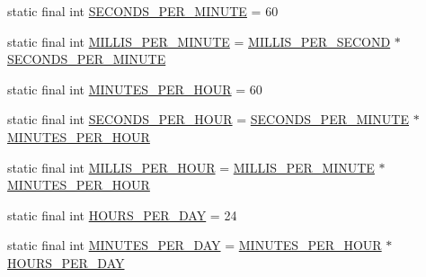 \begin{DoxyCompactItemize}
\item 
static final int \hyperlink{classorg_1_1joda_1_1time_1_1_date_time_constants_a0ad3e335b40d58daae80b70969dbc2ba}{S\-E\-C\-O\-N\-D\-S\-\_\-\-P\-E\-R\-\_\-\-M\-I\-N\-U\-T\-E} = 60
\item 
static final int \hyperlink{classorg_1_1joda_1_1time_1_1_date_time_constants_a4ba885e7d5accee33e78fa3bc8eaf19b}{M\-I\-L\-L\-I\-S\-\_\-\-P\-E\-R\-\_\-\-M\-I\-N\-U\-T\-E} = \hyperlink{classorg_1_1joda_1_1time_1_1_date_time_constants_a909d69e8c8be33d19a569a9912679fe1}{M\-I\-L\-L\-I\-S\-\_\-\-P\-E\-R\-\_\-\-S\-E\-C\-O\-N\-D} $\ast$ \hyperlink{classorg_1_1joda_1_1time_1_1_date_time_constants_a0ad3e335b40d58daae80b70969dbc2ba}{S\-E\-C\-O\-N\-D\-S\-\_\-\-P\-E\-R\-\_\-\-M\-I\-N\-U\-T\-E}
\item 
static final int \hyperlink{classorg_1_1joda_1_1time_1_1_date_time_constants_a4c312d2b4f88dc10b020fff9529814eb}{M\-I\-N\-U\-T\-E\-S\-\_\-\-P\-E\-R\-\_\-\-H\-O\-U\-R} = 60
\item 
static final int \hyperlink{classorg_1_1joda_1_1time_1_1_date_time_constants_ae2282313c878e3f3ad90d3e24c665ed0}{S\-E\-C\-O\-N\-D\-S\-\_\-\-P\-E\-R\-\_\-\-H\-O\-U\-R} = \hyperlink{classorg_1_1joda_1_1time_1_1_date_time_constants_a0ad3e335b40d58daae80b70969dbc2ba}{S\-E\-C\-O\-N\-D\-S\-\_\-\-P\-E\-R\-\_\-\-M\-I\-N\-U\-T\-E} $\ast$ \hyperlink{classorg_1_1joda_1_1time_1_1_date_time_constants_a4c312d2b4f88dc10b020fff9529814eb}{M\-I\-N\-U\-T\-E\-S\-\_\-\-P\-E\-R\-\_\-\-H\-O\-U\-R}
\item 
static final int \hyperlink{classorg_1_1joda_1_1time_1_1_date_time_constants_a6ebecfcef76cb8117f49b12f8961e47a}{M\-I\-L\-L\-I\-S\-\_\-\-P\-E\-R\-\_\-\-H\-O\-U\-R} = \hyperlink{classorg_1_1joda_1_1time_1_1_date_time_constants_a4ba885e7d5accee33e78fa3bc8eaf19b}{M\-I\-L\-L\-I\-S\-\_\-\-P\-E\-R\-\_\-\-M\-I\-N\-U\-T\-E} $\ast$ \hyperlink{classorg_1_1joda_1_1time_1_1_date_time_constants_a4c312d2b4f88dc10b020fff9529814eb}{M\-I\-N\-U\-T\-E\-S\-\_\-\-P\-E\-R\-\_\-\-H\-O\-U\-R}
\item 
static final int \hyperlink{classorg_1_1joda_1_1time_1_1_date_time_constants_a7f1596f04a1286361388fba599d75034}{H\-O\-U\-R\-S\-\_\-\-P\-E\-R\-\_\-\-D\-A\-Y} = 24
\item 
static final int \hyperlink{classorg_1_1joda_1_1time_1_1_date_time_constants_a522a434d1fac486c8cd834d56bfe886b}{M\-I\-N\-U\-T\-E\-S\-\_\-\-P\-E\-R\-\_\-\-D\-A\-Y} = \hyperlink{classorg_1_1joda_1_1time_1_1_date_time_constants_a4c312d2b4f88dc10b020fff9529814eb}{M\-I\-N\-U\-T\-E\-S\-\_\-\-P\-E\-R\-\_\-\-H\-O\-U\-R} $\ast$ \hyperlink{classorg_1_1joda_1_1time_1_1_date_time_constants_a7f1596f04a1286361388fba599d75034}{H\-O\-U\-R\-S\-\_\-\-P\-E\-R\-\_\-\-D\-A\-Y}

\end{DoxyCompactItemize}
